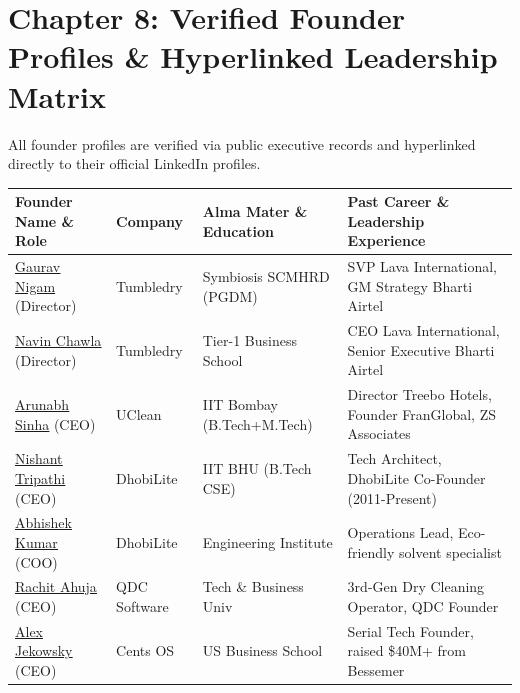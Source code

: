 \documentclass[11pt,a4paper]{article}
\begin{document}
\clearpage

\section{Chapter 8: Verified Founder Profiles \& Hyperlinked Leadership Matrix}

All founder profiles are verified via public executive records and hyperlinked directly to their official LinkedIn profiles.

\begin{table}[h!]
\centering
\scriptsize
\begin{tabularx}{\textwidth}{XXXX}
\toprule
\textbf{Founder Name \& Role} & \textbf{Company} & \textbf{Alma Mater \& Education} & \textbf{Past Career \& Leadership Experience} \\
\midrule
\href{https://www.linkedin.com/in/gaurav-nigam-31b31215/}{\underline{Gaurav Nigam}} (Director) & Tumbledry & Symbiosis SCMHRD (PGDM) & SVP Lava International, GM Strategy Bharti Airtel \\
\href{https://www.linkedin.com/in/navin-chawla-8b350614/}{\underline{Navin Chawla}} (Director) & Tumbledry & Tier-1 Business School & CEO Lava International, Senior Executive Bharti Airtel \\
\href{https://www.linkedin.com/in/arunabhsinha/}{\underline{Arunabh Sinha}} (CEO) & UClean & IIT Bombay (B.Tech+M.Tech) & Director Treebo Hotels, Founder FranGlobal, ZS Associates \\
\href{https://www.linkedin.com/in/nishant-tripathi-99b3b016/}{\underline{Nishant Tripathi}} (CEO) & DhobiLite & IIT BHU (B.Tech CSE) & Tech Architect, DhobiLite Co-Founder (2011-Present) \\
\href{https://www.linkedin.com/in/abhishek-kumar-b7a42118/}{\underline{Abhishek Kumar}} (COO) & DhobiLite & Engineering Institute & Operations Lead, Eco-friendly solvent specialist \\
\href{https://www.linkedin.com/in/rachit-ahuja-71285b12/}{\underline{Rachit Ahuja}} (CEO) & QDC Software & Tech \& Business Univ & 3rd-Gen Dry Cleaning Operator, QDC Founder \\
\href{https://www.linkedin.com/in/alexjekowsky/}{\underline{Alex Jekowsky}} (CEO) & Cents OS & US Business School & Serial Tech Founder, raised \$40M+ from Bessemer \\

\end{tabularx}
\end{table}
\end{document}
